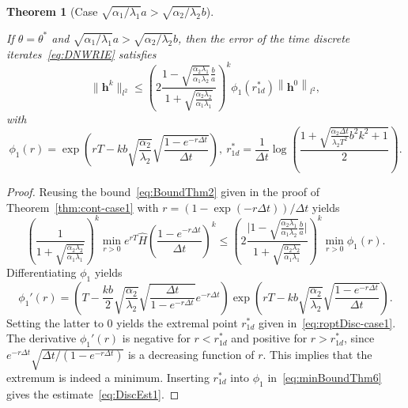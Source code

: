 \documentclass[reqno]{amsart}
\newtheorem{theorem}{Theorem}
\newcommand{\norm}[1]{\left\lVert#1\right\rVert}
\begin{document}
\begin{theorem}[Case $\sqrt{\alpha_1/\lambda_1} a > \sqrt{\alpha_2/\lambda_2} b$]\label{thm:timeDisc-case1}

If $\theta = \theta^*$ and $\sqrt{\alpha_1/\lambda_1} a > \sqrt{\alpha_2/\lambda_2} b$, then the error of the time discrete iterates~\eqref{eq:DNWRIE} satisfies
\begin{equation}\label{eq:DiscEst1}
\|\boldsymbol{h}^k\|_{l^2} \leq  \left(2\frac{1 - \sqrt{\frac{\alpha_2 \lambda_1}{\alpha_1\lambda_2}}\frac{b}{a}}{1 + \sqrt{\frac{\alpha_2 \lambda_2}{\alpha_1\lambda_1}}} \right)^k \phi_1(r_{1d}^*) \norm{\boldsymbol{h}^0}_{l^2},
\end{equation}
with
\begin{equation}\label{eq:roptDisc-case1}
\phi_1(r) = \exp\left( rT  - kb\sqrt{\frac{\alpha_2}{\lambda_2}}\sqrt{\frac{1-e^{-r \Delta t}}{\Delta t}}\right), \ r^*_{1d} = \frac1{\Delta t}\log\left(\frac{1 + \sqrt{\frac{\alpha_2\Delta t}{\lambda_2T^2} b^2 k^2   + 1}}{2}\right).
\end{equation}
\end{theorem}

\begin{proof}
Reusing the bound~\eqref{eq:BoundThm2} given in the proof of Theorem~\ref{thm:cont-case1} with $r = (1-\exp(-r \Delta t))/\Delta t$ yields
\begin{equation}\label{eq:minBoundThm6}
\left(\frac1{1+\sqrt{\frac{\alpha_2\lambda_2}{\alpha_1\lambda_1}}}\right)^k\min_{r>0}e^{rT} \hat H \left(\frac{1-e^{-r \Delta t}}{\Delta t}\right)^k 
\leq \left(2\frac{\bigl|1 - \sqrt{\frac{\alpha_2 \lambda_1}{\alpha_1\lambda_2}}\frac{b}{a}\bigr|}{1 + \sqrt{\frac{\alpha_2 \lambda_2}{\alpha_1 \lambda_1}}} \right)^k\min_{r > 0} \phi_1(r).
\end{equation}
 Differentiating $\phi_1$ yields
\[\phi_1'(r) = \left(T - \frac{kb}{2}\sqrt{\frac{\alpha_2}{\lambda_2}}\sqrt{\frac{\Delta t}{1 - e^{-r \Delta t}}} e^{-r \Delta t} \right)\exp\left(r T -  kb\sqrt{\frac{\alpha_2}{\lambda_2}} \sqrt{\frac{1 - e^{-r \Delta t}}{\Delta t}} \right).\]
Setting the latter to 0 yields the extremal point $r^*_{1d}$ given in~\eqref{eq:roptDisc-case1}. The derivative $\phi_1'(r)$ is negative for $r<r^*_{1d}$ and positive for $r>r^*_{1d}$, since $e^{-r \Delta t}\sqrt{\Delta t/(1 - e^{-r \Delta t})}$ is a decreasing function of $r$. This implies that the extremum is indeed a minimum. Inserting $r^*_{1d}$ into $\phi_1$ in~\eqref{eq:minBoundThm6} gives the estimate~\eqref{eq:DiscEst1}.
\end{proof}
\end{document}
